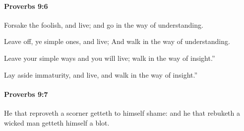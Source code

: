 		\paragraph{Proverbs 9:6} %
			\label{PROVERBS-9-6}

			Forsake the foolish, and live; and go in the way of understanding.

			\begin{versebox}
					\item[BHS] 
					\item[ASV] Leave off, ye simple ones, and live; And walk in the way of understanding.
					\item[NIV] Leave your simple ways and you will live; walk in the way of insight.”
					\item[NRSV] Lay aside immaturity, and live, and walk in the way of insight.”
			\end{versebox}

		\paragraph{Proverbs 9:7} %
			\label{PROVERBS-9-7}

			He that reproveth a scorner getteth to himself shame: and he that rebuketh a wicked man getteth himself a blot.

